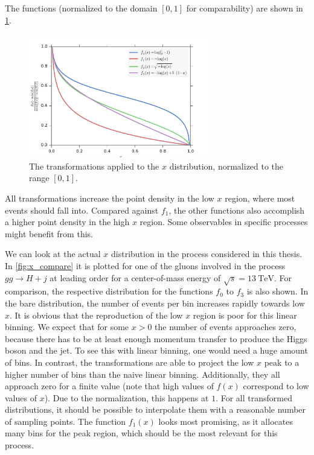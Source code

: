 The functions (normalized to the domain $[0,1]$ for comparability) are shown in \cref{fig:xtransform}.%
%
\begin{figure}[]
	\includegraphics[width=0.7\textwidth]{images/xtransform.pdf}
	\caption{The transformations applied to the $x$ distribution, normalized to the range $[0,1]$.}
	\label{fig:xtransform}
\end{figure}
%
All transformations increase the point density in the low $x$ region, where most events should fall into.
Compared against $f_1$, the other functions also accomplish a higher point density in the high $x$ region.
Some observables in specific processes might benefit from this.

We can look at the actual $x$ distribution in the process considered in this thesis.
In \cref{fig:x_compare} it is plotted for one of the gluons involved in the process $gg \rightarrow H + j$ at leading order for a center-of-mass energy of $\sqrt{s} = \SI{13}{\tera\electronvolt}$.
For comparison, the respective distribution for the functions $f_0$ to $f_3$ is also shown.
In the bare distribution, the number of events per bin increases rapidly towards low $x$.
It is obvious that the reproduction of the low $x$ region is poor for this linear binning.
We expect that for some $x>0$ the number of events approaches zero, because there has to be at least enough momentum transfer to produce the Higgs boson and the jet.
To see this with linear binning, one would need a huge amount of bins.
In contrast, the transformations are able to project the low $x$ peak to a higher number of bins than the naive linear binning.
Additionally, they all approach zero for a finite value (note that high values of $f(x)$ correspond to low values of $x$).
Due to the normalization, this happens at $1$.
For all transformed distributions, it should be possible to interpolate them with a reasonable number of sampling points.
The function $f_1(x)$ looks most promising, as it allocates many bins for the peak region, which should be the most relevant for this process.


